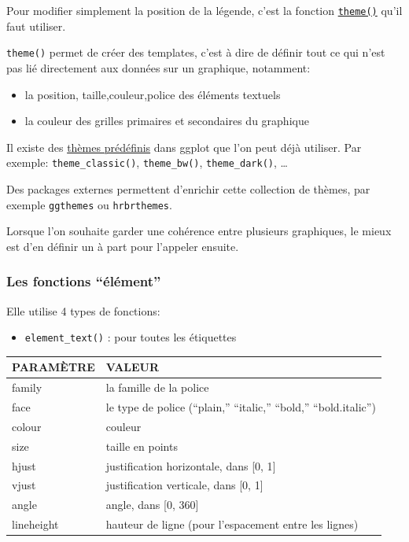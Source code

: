 \documentclass[
]{book}
\providecommand{\tightlist}{%
  \setlength{\itemsep}{0pt}\setlength{\parskip}{0pt}}
\begin{document}
Pour modifier simplement la position de la légende, c'est la fonction \href{http://ggplot2.tidyverse.org/reference/theme.html}{\texttt{theme()}} qu'il faut utiliser.

\texttt{theme()} permet de créer des templates, c'est à dire de définir tout ce qui n'est pas lié directement aux données sur un graphique, notamment:

\begin{itemize}
\item
  la position, taille,couleur,police des éléments textuels
\item
  la couleur des grilles primaires et secondaires du graphique
\end{itemize}

Il existe des \href{http://ggplot2.tidyverse.org/reference/index.html\#section-themes}{thèmes prédéfinis} dans ggplot que l'on peut déjà utiliser.
Par exemple: \texttt{theme\_classic()}, \texttt{theme\_bw()}, \texttt{theme\_dark()}, \ldots{}

Des packages externes permettent d'enrichir cette collection de thèmes, par exemple \texttt{ggthemes} ou \texttt{hrbrthemes}.

Lorsque l'on souhaite garder une cohérence entre plusieurs graphiques, le mieux est d'en définir un à part pour l'appeler ensuite.

\hypertarget{les-fonctions-uxe9luxe9ment}{%
\subsubsection{Les fonctions ``élément''}\label{les-fonctions-uxe9luxe9ment}}

Elle utilise 4 types de fonctions:

\begin{itemize}
\tightlist
\item
  \texttt{element\_text()} : pour toutes les étiquettes
\end{itemize}

\begin{longtable}[]{@{}ll@{}}
\toprule
PARAMÈTRE & VALEUR \\
\midrule
\endhead
family & la famille de la police \\
face & le type de police (``plain,'' ``italic,'' ``bold,'' ``bold.italic'') \\
colour & couleur \\
size & taille en points \\
hjust & justification horizontale, dans {[}0, 1{]} \\
vjust & justification verticale, dans {[}0, 1{]} \\
angle & angle, dans {[}0, 360{]} \\
lineheight & hauteur de ligne (pour l'espacement entre les lignes) \\
\bottomrule
\end{longtable}
\end{document}
